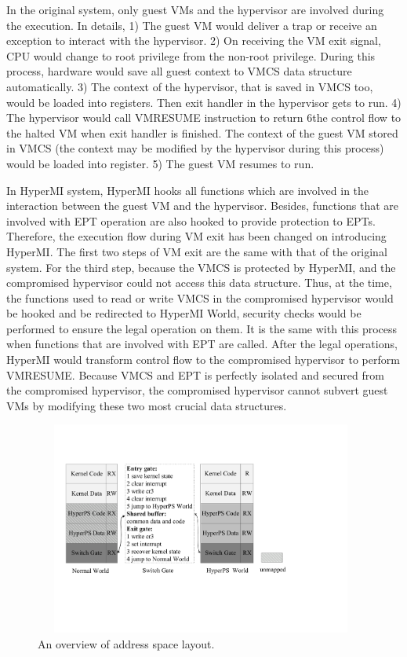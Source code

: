 \documentclass[conference]{IEEEtran}
\begin{document}
In the original system, only guest VMs and the hypervisor are involved during the execution. In details, 1) The guest VM would deliver a trap or receive an exception to interact with the hypervisor. 2) On receiving the VM exit signal, CPU would change to root privilege from the non-root privilege. During this process, hardware would save all guest context to VMCS data structure automatically. 3) The context of the hypervisor, that is saved in VMCS too, would be loaded into registers. Then exit handler in the hypervisor gets to run. 4) The hypervisor would call VMRESUME instruction to return 6the control flow to the halted VM when exit handler is finished. The context of the guest VM stored in VMCS (the context may be modified by the hypervisor during this process) would be loaded into register. 5) The guest VM resumes to run.

In HyperMI system, HyperMI hooks all functions which are involved in the interaction between the guest VM and the hypervisor. Besides, functions that are involved with EPT operation are also hooked to provide protection to EPTs. Therefore, the execution flow during VM exit has been changed on introducing HyperMI. The first two steps of VM exit are the same with that of the original system. For the third step, because the VMCS is protected by HyperMI, and the compromised hypervisor could not access this data structure. Thus, at the time, the functions used to read or write VMCS in the compromised hypervisor would be hooked and be redirected to HyperMI World, security checks would be performed to ensure the legal operation on them. It is the same with this process when functions that are involved with EPT are called. 
After the legal operations, HyperMI would transform control flow to the compromised hypervisor to perform VMRESUME. Because VMCS and EPT is perfectly isolated and secured from the compromised hypervisor, the compromised hypervisor cannot subvert guest VMs by modifying these two most crucial data structures.

\fi





\begin{figure}
\centerline{\includegraphics[width=11cm, height=7cm]{pdfvmcs2.pdf}}%
\caption{An overview of address space layout.} \label{fig2}
\end{figure}
\end{document}
